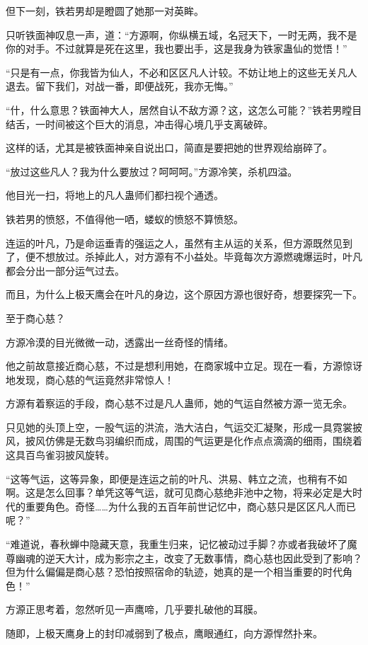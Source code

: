 \begin{this_body}
但下一刻，铁若男却是瞪圆了她那一对英眸。

只听铁面神叹息一声，道：“方源啊，你纵横五域，名冠天下，一时无两，我不是你的对手。不过就算是死在这里，我也要出手，这是我身为铁家蛊仙的觉悟！”

“只是有一点，你我皆为仙人，不必和区区凡人计较。不妨让地上的这些无关凡人退去。留下我们，对战一番，即便战死，我亦无悔。”

“什，什么意思？铁面神大人，居然自认不敌方源？这，这怎么可能？”铁若男瞠目结舌，一时间被这个巨大的消息，冲击得心境几乎支离破碎。

这样的话，尤其是被铁面神亲自说出口，简直是要把她的世界观给崩碎了。

“放过这些凡人？我为什么要放过？呵呵呵。”方源冷笑，杀机四溢。

他目光一扫，将地上的凡人蛊师们都扫视个通透。

铁若男的愤怒，不值得他一哂，蝼蚁的愤怒不算愤怒。

连运的叶凡，乃是命运垂青的强运之人，虽然有主从运的关系，但方源既然见到了，便不想放过。杀掉此人，对方源有不小益处。毕竟每次方源燃魂爆运时，叶凡都会分出一部分运气过去。

而且，为什么上极天鹰会在叶凡的身边，这个原因方源也很好奇，想要探究一下。

至于商心慈？

方源冷漠的目光微微一动，透露出一丝奇怪的情绪。

他之前故意接近商心慈，不过是想利用她，在商家城中立足。现在一看，方源惊讶地发现，商心慈的气运竟然非常惊人！

方源有着察运的手段，商心慈不过是凡人蛊师，她的气运自然被方源一览无余。

只见她的头顶上空，一股气运的洪流，浩大洁白，气运交汇凝聚，形成一具霓裳披风，披风仿佛是无数鸟羽编织而成，周围的气运更是化作点点滴滴的细雨，围绕着这具百鸟雀羽披风旋转。

“这等气运，这等异象，即便是连运之前的叶凡、洪易、韩立之流，也稍有不如啊。这是怎么回事？单凭这等气运，就可见商心慈绝非池中之物，将来必定是大时代的重要角色。奇怪……为什么我的五百年前世记忆中，商心慈只是区区凡人而已呢？”

“难道说，春秋蝉中隐藏天意，我重生归来，记忆被动过手脚？亦或者我破坏了魔尊幽魂的逆天大计，成为影宗之主，改变了无数事情，商心慈也因此受到了影响？但为什么偏偏是商心慈？恐怕按照宿命的轨迹，她真的是一个相当重要的时代角色！”

方源正思考着，忽然听见一声鹰啼，几乎要扎破他的耳膜。

随即，上极天鹰身上的封印减弱到了极点，鹰眼通红，向方源悍然扑来。


\end{this_body}
